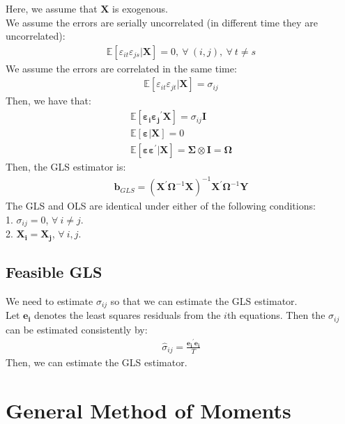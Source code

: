 \documentclass{article}
\begin{document}
Here, we assume that $\boldsymbol{X}$ is exogenous.\\
We assume the errors are serially uncorrelated (in different time they are uncorrelated):
	\begin{align*}
		\mathbb{E}[\varepsilon_{it} \varepsilon_{js} | \boldsymbol{X}] = 0,\ \forall\ (i, j),\ \forall\ t \neq s
	\end{align*}
We assume the errors are correlated in the same time:
	\begin{align*}
		\mathbb{E}[\varepsilon_{it} \varepsilon_{jt} | \boldsymbol{X}] = \sigma_{ij}
	\end{align*}
Then, we have that:
	\begin{align*}
		\mathbb{E}[\boldsymbol{\varepsilon_i} \boldsymbol{\varepsilon_j}^\prime \boldsymbol{X}] = \sigma_{ij} \boldsymbol{I}\\
		\mathbb{E} [\boldsymbol{\varepsilon} | \boldsymbol{X}] = 0\\
		\mathbb{E} [\boldsymbol{\varepsilon} \boldsymbol{\varepsilon}^\prime | \boldsymbol{X}] = \boldsymbol{\Sigma} \otimes \boldsymbol{I} = \boldsymbol{\Omega}
	\end{align*}
Then, the GLS estimator is:
	\begin{align*}
		\boldsymbol{b}_{GLS} = (\boldsymbol{X}^\prime \boldsymbol{\Omega}^{-1} \boldsymbol{X})^{-1} \boldsymbol{X}^\prime \boldsymbol{\Omega}^{-1} \boldsymbol{Y}
	\end{align*}
The GLS and OLS are identical under either of the following conditions:\\
1. $\sigma_{ij} = 0$, $\forall\ i \neq j$.\\
2. $\boldsymbol{X_i} = \boldsymbol{X_j}$, $\forall\ i, j$.


\subsection{Feasible GLS}
We need to estimate $\sigma_{ij}$ so that we can estimate the GLS estimator.\\
Let $\boldsymbol{e_i}$ denotes the least squares residuals from the $i$th equations. Then the $\sigma_{ij}$ can be estimated consistently by:
	\begin{align*}
		\hat{\sigma}_{ij} = \frac{\boldsymbol{e_i}^\prime \boldsymbol{e_i}}{T}
	\end{align*}
Then, we can estimate the GLS estimator.	



\newpage
\section{General Method of Moments}
\end{document}

